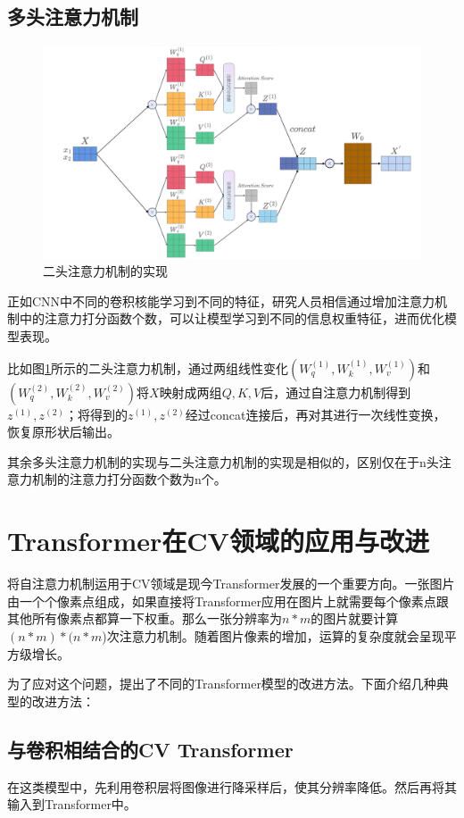 \subsection{多头注意力机制}

\begin{figure}[h]
	\centering
	\includegraphics[width=0.9\columnwidth]{image/chap03/img312.png}
	\caption{二头注意力机制的实现}
	\label{img312}
\end{figure}

正如CNN中不同的卷积核能学习到不同的特征，研究人员相信通过增加注意力机制中的注意力打分函数个数，可以让模型学习到不同的信息权重特征，进而优化模型表现。

比如图\ref{img312}所示的二头注意力机制，通过两组线性变化$(W_q^{(1)},W_k^{(1)},W_v^{(1)})$和$(W_q^{(2)},W_k^{(2)},W_v^{(2)})$将$X$映射成两组$Q,K,V$后，通过自注意力机制得到$z^{(1)},z^{(2)}$；将得到的$z^{(1)},z^{(2)}$经过concat连接后，再对其进行一次线性变换，恢复原形状后输出。

其余多头注意力机制的实现与二头注意力机制的实现是相似的，区别仅在于n头注意力机制的注意力打分函数个数为n个。

\section{Transformer在CV领域的应用与改进}
将自注意力机制运用于CV领域是现今Transformer发展的一个重要方向。一张图片由一个个像素点组成，如果直接将Transformer应用在图片上就需要每个像素点跟其他所有像素点都算一下权重。那么一张分辨率为$n*m$的图片就要计算$(n*m)*(n*m$)次注意力机制。随着图片像素的增加，运算的复杂度就会呈现平方级增长。

为了应对这个问题，提出了不同的Transformer模型的改进方法。下面介绍几种典型的改进方法：

\subsection{与卷积相结合的CV Transformer}
在这类模型中，先利用卷积层将图像进行降采样后，使其分辨率降低。然后再将其输入到Transformer中。

